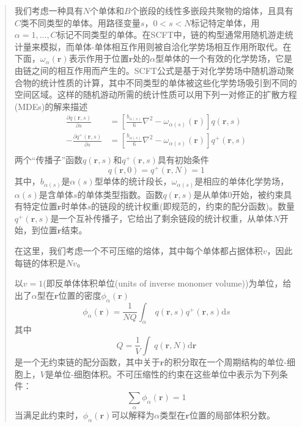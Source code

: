 \documentclass{article}
\begin{document}
\begin{CJK}{UTF8}{gkai}
\begin{quotation}
我们考虑一种具有$N$个单体和$B$个嵌段的线性多嵌段共聚物的熔体，且具有$C$类不同类型的单体。用路径变量$s$，$0<s<N$标记特定单体，用$\alpha=1,...,C$标记不同类型的单体。在SCFT中，链的构型通常用随机游走统计量来模拟，而单体-单体相互作用则被自洽化学势场相互作用所取代。在下面，$\omega_{\alpha}(\mathbf{r})$表示作用于位置$\mathbf{r}$处的$\alpha$型单体的一个有效的化学势场，它是由链之间的相互作用而产生的。SCFT公式是基于对化学势场中随机游动聚合物的统计性质的计算，其中不同类型的单体被这些化学势场吸引到不同的空间区域。这样的随机游动所需的统计性质可以用下列一对修正的扩散方程(MDEs)的解来描述
\begin{equation}\label{1}
\begin{aligned}
\frac{\partial q(\mathbf{r},s)}{\partial s} & = \left[ \frac{b_{\alpha (s)}}{6}\nabla ^2 - \omega_{\alpha (s)}(\mathbf{r}) \right]q(\mathbf{r},s)\\
-\frac{\partial q^{+}(\mathbf{r},s)}{\partial s} & = \left[ \frac{b_{\alpha (s)}}{6}\nabla ^2 - \omega_{\alpha (s)}(\mathbf{r}) \right]q^{+}(\mathbf{r},s)\\
\end{aligned}
\end{equation}
两个“传播子”函数$q(\mathbf{r},s)$和$q^{+}(\mathbf{r},s)$具有初始条件
\begin{equation}\label{2}
q(\mathbf{r},0)=q^{+}(\mathbf{r},N)=1
\end{equation}
其中，$b_{\alpha (s)}$是$\alpha (s)$型单体的统计段长，$\omega_{\alpha (s)}$是相应的单体化学势场，$\alpha (s)$是含单体$s$的单体类型指数。函数$q(\mathbf{r},s)$是从单体$0$开始，被约束具有特定位置$\mathbf{r}$时单体$s$的链段的统计权重(即规范的，约束的配分函数)。数量$q^{+}(\mathbf{r},s)$是一个互补传播子，它给出了剩余链段的统计权重，从单体$N$开始，到位置$\mathbf{r}$结束。

在这里，我们考虑一个不可压缩的熔体，其中每个单体都占据体积$v$，因此每链的体积是$Nv$。

以$v=1$(即反单体体积单位(units of inverse monomer volume))为单位，给出了$\alpha$型在$\mathbf{r}$位置的密度$\phi_{\alpha}(\mathbf{r})$
\begin{equation}\label{3}
\phi_{\alpha}(\mathbf{r})=\frac{1}{NQ}\int _{\alpha}~q(\mathbf{r},s)q^{+}(\mathbf{r},s) \mathrm{d}s
\end{equation}
其中
\begin{equation}\label{4}
Q=\frac{1}{V}\int ~q(\mathbf{r},N) \mathrm{d}\mathbf{r}
\end{equation}
是一个无约束链的配分函数，其中关于$\mathbf{r}$的积分取在一个周期结构的单位-细胞上，$V$是单位-细胞体积。不可压缩性的约束在这些单位中表示为下列条件：
\begin{equation}\label{5}
\sum _{\alpha}\phi_{\alpha}(\mathbf{r})=1
\end{equation}
当满足此约束时，$\phi_{\alpha}(\mathbf{r})$可以解释为$\alpha$类型在$\mathbf{r}$位置的局部体积分数。


\end{quotation}
\end{CJK}
\end{document}
